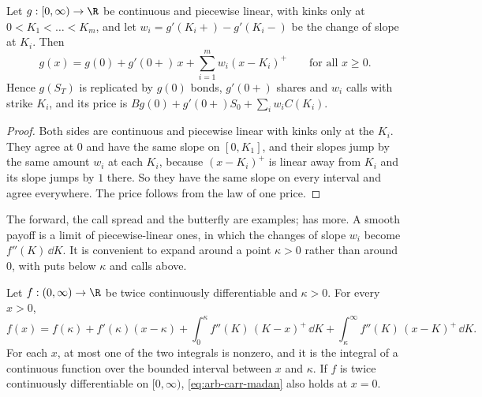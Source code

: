\begin{lemma}\label{lem:arb-piecewise}
Let $g:[0,\infty)\to\R$ be continuous and piecewise linear, with kinks only at
$0<K_1<\dots<K_m$, and let $w_i=g'(K_i+)-g'(K_i-)$ be the change of slope at $K_i$. Then
\[
  g(x)=g(0)+g'(0+)\,x+\sum_{i=1}^mw_i(x-K_i)^+\qquad\text{for all }x\ge0 .
\]
Hence $g(S_T)$ is replicated by $g(0)$ bonds, $g'(0+)$ shares and $w_i$ calls with strike
$K_i$, and its price is $Bg(0)+g'(0+)S_0+\sum_iw_iC(K_i)$.
\end{lemma}

\begin{proof}
Both sides are continuous and piecewise linear with kinks only at the $K_i$. They agree at
$0$ and have the same slope on $[0,K_1]$, and their slopes jump by the same amount $w_i$ at
each $K_i$, because $(x-K_i)^+$ is linear away from $K_i$ and its slope jumps by $1$ there. So
they have the same slope on every interval and agree everywhere. The price follows from the
law of one price.
\end{proof}

The forward, the call spread and the butterfly are examples;  has
more. A smooth payoff is a limit of piecewise-linear ones, in which the changes of slope
$w_i$ become $f''(K)\,\dd K$. It is convenient to expand around a point $\kappa>0$ rather than
around $0$, with puts below $\kappa$ and calls above.

\begin{theorem}\label{thm:arb-carr-madan}
Let $f:(0,\infty)\to\R$ be twice continuously differentiable and $\kappa>0$. For every $x>0$,
\begin{equation}\label{eq:arb-carr-madan}
  f(x)=f(\kappa)+f'(\kappa)(x-\kappa)+\int_0^\kappa f''(K)\,(K-x)^+\,\dd K
  +\int_\kappa^\infty f''(K)\,(x-K)^+\,\dd K .
\end{equation}
For each $x$, at most one of the two integrals is nonzero, and it is the integral of a
continuous function over the bounded interval between $x$ and $\kappa$. If $f$ is twice
continuously differentiable on $[0,\infty)$, \eqref{eq:arb-carr-madan} also holds at $x=0$.
\end{theorem}

